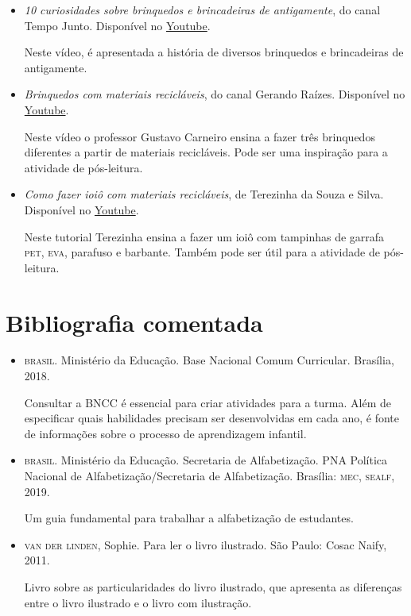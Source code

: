 \documentclass[11pt]{extarticle}
\begin{document}
\begin{itemize}

\item \textit{10 curiosidades sobre brinquedos e brincadeiras de antigamente}, do canal Tempo Junto. Disponível no \href{https://www.youtube.com/watch?v=oGzmQm7RZGQ&ab_channel=Tempojunto}{Youtube}. 

Neste vídeo, é apresentada a história de diversos brinquedos e brincadeiras de antigamente.

\item \textit{Brinquedos com materiais recicláveis}, do canal Gerando Raízes. Disponível no \href{https://www.youtube.com/watch?v=qeNmZrRDfrw&ab_channel=GERANDORAIZES}{Youtube}. 

Neste vídeo o professor Gustavo Carneiro ensina a fazer três brinquedos diferentes a partir de materiais recicláveis. Pode ser uma inspiração para a atividade de pós-leitura.

\item \textit{Como fazer ioiô com materiais recicláveis}, de Terezinha da Souza e Silva. Disponível no \href{https://www.youtube.com/watch?v=iWO3JFAAvJc&ab_channel=TerezinhadeSouzadaSilva}{Youtube}. 

Neste tutorial Terezinha ensina a fazer um ioiô com tampinhas de garrafa \textsc{pet}, \textsc{eva}, parafuso e barbante. Também pode ser útil para a atividade de pós-leitura. 

\end{itemize}

\section{Bibliografia comentada}

\begin{itemize}
\item \textsc{brasil}. Ministério da Educação. Base Nacional Comum Curricular. Brasília, 2018.

Consultar a \textsc{BNCC} é essencial para criar atividades para a turma. Além de especificar 
quais habilidades precisam ser desenvolvidas em cada ano, é fonte de informações sobre 
o processo de aprendizagem infantil. 
 
\item \textsc{brasil}. Ministério da Educação. Secretaria de Alfabetização. PNA Política Nacional de Alfabetização/Secretaria 
de Alfabetização. Brasília: \textsc{mec, sealf}, 2019.

Um guia fundamental para trabalhar a alfabetização de estudantes.

\item \textsc{van der linden}, Sophie. Para ler o livro ilustrado. São Paulo: Cosac Naify, 2011.

Livro sobre as particularidades do livro ilustrado, que apresenta as diferenças entre o livro ilustrado e o livro com ilustração. 
\end{itemize}
\end{document}
